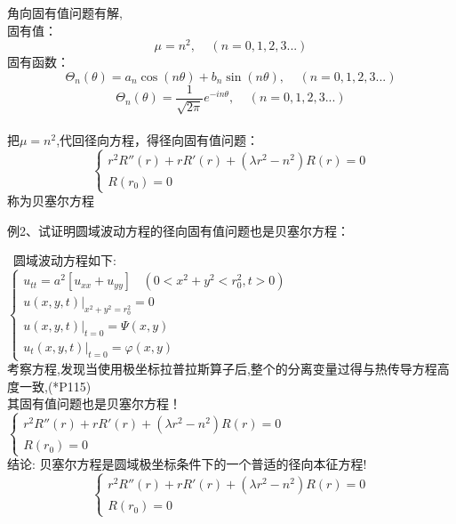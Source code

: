 	角向固有值问题有解,\\
	固有值：
	\begin{equation*}
		\mu=n^2, ~~~~~(n=0,1,2,3...)
	\end{equation*}
	固有函数：
	\begin{equation*}
		\Theta_n(\theta) = a_n \cos(n\theta)+b_n \sin(n\theta), ~~~~~(n=0,1,2,3...)
	\end{equation*}
	\begin{equation*}
		\Theta_n(\theta) = \frac{1}{\sqrt{2\pi}} e^{-i n \theta }, ~~~~~(n=0,1,2,3...)
	\end{equation*}
	~\\
	把$\mu=n^2$,代回径向方程，得径向固有值问题：\vspace{0.6em}
	\[ \boxed{ \begin{cases}
		r^2 R'' (r)+r R'(r) +( \lambda r^2 -n^2)R(r)=0  \\
		R(r_0)=0
	\end{cases} }\]	
	称为贝塞尔方程	



	\begin{example} {例2、试证明圆域波动方程的径向固有值问题也是贝塞尔方程：}~ ~
	\end{example}
	{\证}~圆域波动方程如下:\\
	$\begin{cases}
		u_{tt}=a^2 [u_{xx}   +u_{yy}] ~~~~ (0< x^2 +y^2 <r_0 ^2, t>0)\\
		u(x,y,t)|_{x^2+y^2=r_0 ^2}= 0 \\
		u(x,y,t)|_{t=0}= \Psi(x,y) \\
		u_t (x,y,t)|_{t=0}= \varphi  (x,y) 
	\end{cases} $\\	\vspace{0.6em}
	考察方程,发现当使用极坐标拉普拉斯算子后,整个的分离变量过得与热传导方程高度一致,(*P115)\\
	其固有值问题也是贝塞尔方程！\\ \vspace{0.6em}
	$\begin{cases}
		r^2 R'' (r)+r R'(r) +( \lambda r^2 -n^2)R(r)=0  \\
		R(r_0)=0
	\end{cases} $\\		



	{结论: }
	贝塞尔方程是圆域极坐标条件下的一个普适的径向本征方程! \\ \vspace{2em}
	\[\begin{cases}
		r^2 R'' (r)+r R'(r) +( \lambda r^2 -n^2)R(r)=0  \\
		R(r_0)=0
	\end{cases}  \]\\	


